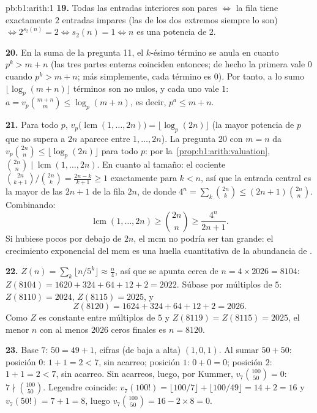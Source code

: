 \begin{solution}{pb:b1:arith:1}
\textbf{19.} Todas las entradas interiores son pares $\iff$ la fila
tiene exactamente $2$ entradas impares (las de los dos extremos
siempre lo son) $\iff 2^{s_2(n)} = 2 \iff s_2(n) = 1 \iff n$ es una
potencia de $2$.

\textbf{20.} En la suma de la pregunta 11, el $k$-ésimo término se
anula en cuanto $p^k > m + n$ (las tres partes enteras coinciden
entonces; de hecho la primera vale $0$ cuando $p^k > m+n$; más
simplemente, cada término es $0$). Por tanto, a lo sumo
$\lfloor \log_p(m+n)\rfloor$ términos son no nulos, y cada uno vale
$1$: $a = v_p\binom{m+n}m \leq \log_p(m+n)$, es decir,
$p^a \leq m + n$.

\textbf{21.} Para todo  $p$,
$v_p\bigl(\operatorname{lcm}(1, \dots, 2n)\bigr) =
\lfloor\log_p(2n)\rfloor$ (la mayor potencia de $p$ que no supera a
$2n$ aparece entre $1, \dots, 2n$). La pregunta 20 con $m = n$ da
$v_p\binom{2n}n \leq \lfloor\log_p(2n)\rfloor$ para todo $p$: por
la~\cref{prop:b1:arith:valuation}, $\binom{2n}n \mid
\operatorname{lcm}(1, \dots, 2n)$. En cuanto al tamaño: el cociente
$\binom{2n}{k+1}/\binom{2n}k = \frac{2n-k}{k+1} \geq 1$ exactamente
para $k < n$, así que la entrada central es la mayor de las $2n + 1$
de la fila $2n$, de donde $4^n = \sum_k \binom{2n}k \leq
(2n+1)\binom{2n}n$. Combinando:
\[
\operatorname{lcm}(1, \dots, 2n) \geq \binom{2n}n \geq
\frac{4^n}{2n + 1} .
\]
Si hubiese pocos  por debajo de $2n$, el mcm no podría ser tan
grande: el crecimiento exponencial del mcm es una huella cuantitativa
de la abundancia de .

\textbf{22.} $Z(n) = \sum_k\lfloor n/5^k\rfloor \approx \frac n4$,
así que se apunta cerca de $n = 4 \times 2026 = 8104$:
$Z(8104) = 1620 + 324 + 64 + 12 + 2 = 2022$. Súbase por múltiplos de $5$:
$Z(8110) = 2024$, $Z(8115) = 2025$, y
\[
Z(8120) = 1624 + 324 + 64 + 12 + 2 = 2026 .
\]
Como $Z$ es constante entre múltiplos de $5$ y $Z(8119) = Z(8115) =
2025$, el menor $n$ con al menos $2026$ ceros finales es $n = 8120$.

\textbf{23.} Base $7$: $50 = 49 + 1$, cifras (de baja a alta)
$(1, 0, 1)$. Al sumar $50 + 50$: posición $0$: $1 + 1 = 2 < 7$, sin
acarreo; posición $1$: $0 + 0 = 0$; posición $2$: $1 + 1 = 2 < 7$, sin
acarreo. Sin acarreos, luego, por Kummer, $v_7\binom{100}{50} = 0$:
$7 \nmid \binom{100}{50}$. Legendre coincide:
$v_7(100!) = \lfloor 100/7 \rfloor + \lfloor 100/49 \rfloor = 14 + 2 =
16$ y $v_7(50!) = 7 + 1 = 8$, luego
$v_7\binom{100}{50} = 16 - 2\times8 = 0$.


\end{solution}
